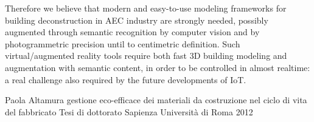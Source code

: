 Therefore we believe that modern and easy-to-use modeling frameworks for building deconstruction in AEC industry are strongly needed, possibly augmented through semantic recognition by computer vision and by photogrammetric precision until to centimetric definition. Such virtual/augmented reality tools require both fast 3D building modeling and augmentation with semantic content, in order to be controlled in almost realtime: a real challenge also required by the future developments of IoT.
 

Paola Altamura
gestione eco-efficace dei materiali da costruzione nel ciclo di vita del fabbricato
Tesi di dottorato
Sapienza Università di Roma
2012